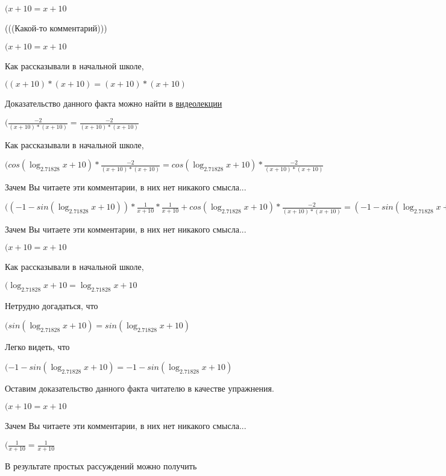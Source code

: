 \documentclass[12pt,a4paper,fleqn]{article}
\theoremstyle{definition}
\begin{document}
$( x  +  10  =  x  +  10 $

(((Какой-то комментарий)))

$( x  +  10  =  x  +  10 $

Как рассказывали в начальной школе,

$(( x  +  10 ) * ( x  +  10 ) = ( x  +  10 ) * ( x  +  10 )$

Доказательство данного факта можно найти в \href{https://www.youtube.com/watch?v=dQw4w9WgXcQ}{видеолекции}

$(\frac{ -2 }{( x  +  10 ) * ( x  +  10 )}
 = \frac{ -2 }{( x  +  10 ) * ( x  +  10 )}
$

Как рассказывали в начальной школе,

$(cos(\log_{ 2.71828 }{ x  +  10 }) * \frac{ -2 }{( x  +  10 ) * ( x  +  10 )}
 = cos(\log_{ 2.71828 }{ x  +  10 }) * \frac{ -2 }{( x  +  10 ) * ( x  +  10 )}
$

Зачем Вы читаете эти комментарии, в них нет никакого смысла...

$(( -1  - sin(\log_{ 2.71828 }{ x  +  10 })) * \frac{ 1 }{ x  +  10 }
 * \frac{ 1 }{ x  +  10 }
 + cos(\log_{ 2.71828 }{ x  +  10 }) * \frac{ -2 }{( x  +  10 ) * ( x  +  10 )}
 = ( -1  - sin(\log_{ 2.71828 }{ x  +  10 })) * \frac{ 1 }{ x  +  10 }
 * \frac{ 1 }{ x  +  10 }
 + cos(\log_{ 2.71828 }{ x  +  10 }) * \frac{ -2 }{( x  +  10 ) * ( x  +  10 )}
$

Зачем Вы читаете эти комментарии, в них нет никакого смысла...

$( x  +  10  =  x  +  10 $

Как рассказывали в начальной школе,

$(\log_{ 2.71828 }{ x  +  10 } = \log_{ 2.71828 }{ x  +  10 }$

Нетрудно догадаться, что

$(sin(\log_{ 2.71828 }{ x  +  10 }) = sin(\log_{ 2.71828 }{ x  +  10 })$

Легко видеть, что

$( -1  - sin(\log_{ 2.71828 }{ x  +  10 }) =  -1  - sin(\log_{ 2.71828 }{ x  +  10 })$

Оставим доказательство данного факта читателю в качестве упражнения.

$( x  +  10  =  x  +  10 $

Зачем Вы читаете эти комментарии, в них нет никакого смысла...

$(\frac{ 1 }{ x  +  10 }
 = \frac{ 1 }{ x  +  10 }
$

В результате простых рассуждений можно получить
\end{document}
